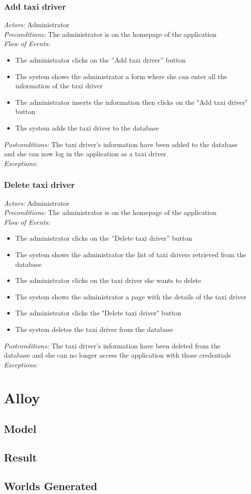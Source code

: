 \documentclass{article}
\begin{document}
	\subsubsection{Add taxi driver}
	\textit{Actors:} Administrator
	\\\textit{Preconditions:} The administrator is on the homepage of the application
	\\\textit{Flow of Events:}
	\begin{itemize}
		\item  The administrator clicks on the ''Add taxi driver'' button
		\item  The system shows the administrator a form where she can enter all the information of the taxi driver %
		\item  The administrator inserts the information then clicks on the "Add taxi driver" button
		\item  The system adds the taxi driver to the database
	\end{itemize}
	\textit{Postconditions:} The taxi driver's information have been added to the database and she can now log in the application as a taxi driver
	\\\textit{Exceptions:}
	
	\subsubsection{Delete taxi driver}
	\textit{Actors:} Administrator
	\\\textit{Preconditions:} The administrator is on the homepage of the application
	\\\textit{Flow of Events:}
	\begin{itemize}
		\item  The administrator clicks on the ''Delete taxi driver'' button
		\item  The system shows the administrator the list of taxi drivers retrieved from the database
		\item  The administrator clicks on the taxi driver she wants to delete
		\item  The system shows the administrator a page with the details of the taxi driver
		\item  The administrator clicks the "Delete taxi driver" button
		\item  The system deletes the taxi driver from the database
	\end{itemize}
	\textit{Postconditions:} The taxi driver's information have been deleted from the database and she can no longer access the application with those credentials
	\\\textit{Exceptions:}
	\clearpage
	\section{Alloy}
	\subsection{Model}
	\texttt{}	
	\subsection{Result}
	\subsection{Worlds Generated}
	
\end{document}

